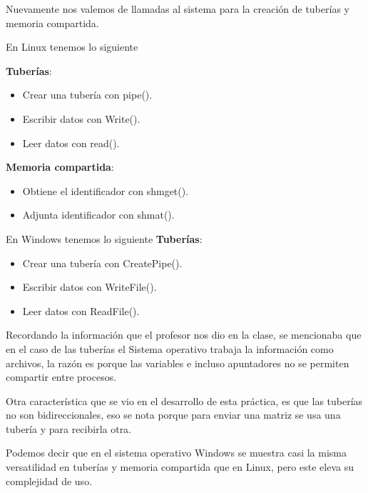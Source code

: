\documentclass[12pt]{article}
\begin{document}
  Nuevamente nos valemos de llamadas al sistema para la creación de tuberías y memoria compartida.
  
  En Linux tenemos lo siguiente
  \begin{multicols}{2}
      \textbf{Tuberías}:  
      \begin{itemize}
          \item[\Checkmark] Crear una tubería con pipe().
          \item[\Checkmark] Escribir datos con Write().
          \item[\Checkmark] Leer datos con read().
      \end{itemize}
\columnbreak
        \textbf{Memoria compartida}:  
      \begin{itemize}
          \item[\Checkmark] Obtiene el identificador con shmget().
          \item[\Checkmark] Adjunta identificador con shmat().
      \end{itemize}
  \end{multicols}

  En Windows tenemos lo siguiente
    \textbf{Tuberías}:
    \begin{itemize}
        \item[\Checkmark] Crear una tubería con CreatePipe().
        \item[\Checkmark] Escribir datos con WriteFile().
        \item[\Checkmark] Leer datos con ReadFile().
    \end{itemize}

    Recordando la información que el profesor nos dio en la clase, se mencionaba que en el caso de las tuberías el Sistema operativo trabaja la información como archivos, la razón es porque las variables e incluso apuntadores no se permiten compartir entre procesos.
    
    Otra característica que se vio en el desarrollo de esta práctica, es que las tuberías no son bidireccionales, eso se nota porque para enviar una matriz se usa una tubería y para recibirla otra.
    
    Podemos decir que en el sistema operativo Windows se muestra casi la misma versatilidad en tuberías y memoria compartida que en Linux, pero este eleva su complejidad de uso.
    
    
  
\end{document}
